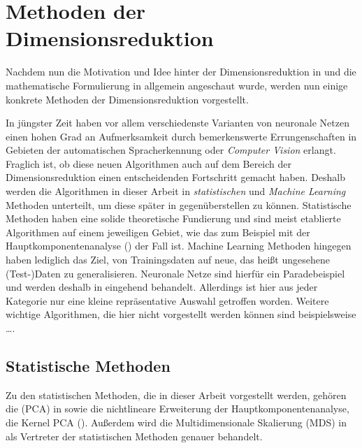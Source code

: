 \chapter{Methoden der Dimensionsreduktion}
\label{ch:MethodenDerDimRed}

Nachdem nun die Motivation und Idee hinter der Dimensionsreduktion in  und
die mathematische Formulierung in  allgemein angeschaut wurde,
werden nun einige konkrete Methoden der Dimensionsreduktion vorgestellt.

In jüngster Zeit haben vor allem verschiedenste Varianten von neuronale Netzen einen hohen Grad an
Aufmerksamkeit durch bemerkenswerte Errungenschaften in Gebieten der automatischen Spracherkennung
oder \textit{Computer Vision} erlangt. Fraglich ist, ob diese neuen Algorithmen auch auf dem
Bereich der Dimensionsreduktion einen entscheidenden Fortschritt gemacht haben. Deshalb werden die
Algorithmen in dieser Arbeit in \textit{statistischen} und \textit{Machine Learning} Methoden
unterteilt, um diese später in  gegenüberstellen zu können. Statistische
Methoden haben eine solide theoretische Fundierung und sind meist etablierte Algorithmen auf einem
jeweiligen Gebiet, wie das zum Beispiel mit der Hauptkomponentenanalyse
() der Fall ist. Machine Learning Methoden hingegen
haben lediglich das Ziel, von Trainingsdaten auf neue, das heißt ungesehene (Test-)Daten zu
generalisieren. Neuronale Netze sind hierfür ein Paradebeispiel und werden deshalb in
 eingehend behandelt. Allerdings ist hier aus jeder Kategorie
nur eine kleine repräsentative Auswahl getroffen worden. Weitere wichtige Algorithmen, die hier
nicht vorgestellt werden können sind beispielsweise \dots {}.

\section{Statistische Methoden}
\label{ch:MethodenDerDimRed:statistisch}

Zu den statistischen Methoden, die in dieser Arbeit vorgestellt werden, gehören die
 (PCA) in  sowie
die nichtlineare Erweiterung der Hauptkomponentenanalyse, die Kernel PCA
(). Außerdem wird die Multidimensionale Skalierung
(MDS) in  als Vertreter der statistischen Methoden
genauer behandelt.


